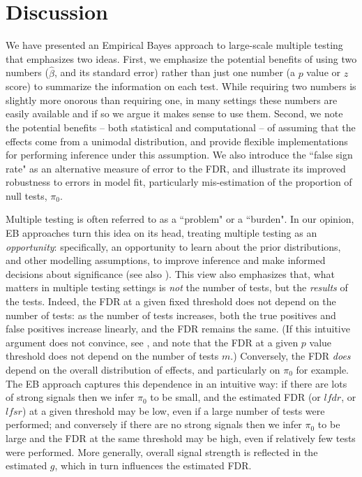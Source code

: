 \documentclass[11pt]{article}
\def\lfdr{\textit{lfdr}}
\def\lfsr{\textit{lfsr}}
\def\bhat{\hat{\beta}}
\begin{document}

\section*{Discussion}

We have presented an Empirical Bayes approach to large-scale multiple testing that emphasizes two ideas.
First, we emphasize the potential benefits of using two numbers ($\bhat$, and its standard error)
rather than just one number (a $p$ value or $z$ score)  to summarize the information on each test.
While requiring two numbers is slightly more onorous than requiring one, in many settings these
numbers are easily available and if so we argue it makes sense to use them.
Second, we note the potential benefits -- both statistical and computational -- of assuming that the effects come from a unimodal distribution, and provide
flexible implementations for performing inference under this assumption. We also introduce the ``false sign rate" as
an alternative measure of error to the FDR, and illustrate its improved robustness to errors in model fit, particularly mis-estimation
of the proportion of null tests, $\pi_0$.

Multiple testing is often referred to as a ``problem" or a ``burden". In our opinion, EB approaches turn this idea on its head,
treating multiple testing as an {\it opportunity}: specifically, an opportunity to learn about the prior distributions, and other modelling assumptions,
to improve inference and make informed decisions about significance (see also \cite{greenland1991empirical}). This view
also emphasizes that, what matters in multiple testing settings is {\it not} the number of tests, but the {\it results} of the tests.
Indeed, the FDR at a given fixed threshold does not depend on the number of tests: as the number of tests increases, both the true positives and false positives increase linearly,
and the FDR remains the same. (If this intuitive argument does not convince, see \cite{storey.03}, and note that the FDR at a given $p$ value threshold does not depend on the number of tests $m$.) Conversely, the FDR {\it does} depend on the overall distribution of effects, and particularly on $\pi_0$ for example. 
The EB approach captures this dependence in an intuitive way:
if there are lots of strong signals then we infer $\pi_0$ to be small, and the estimated FDR (or $\lfdr$, or $\lfsr$) at a given threshold may be low, even if a large number of tests were performed; and conversely
if there are no strong signals then we infer $\pi_0$ to be large and the FDR at the same threshold may be high, even if relatively few tests were performed. 
More generally, overall signal strength is reflected in the estimated $g$, which in turn influences the estimated FDR.
\end{document}
